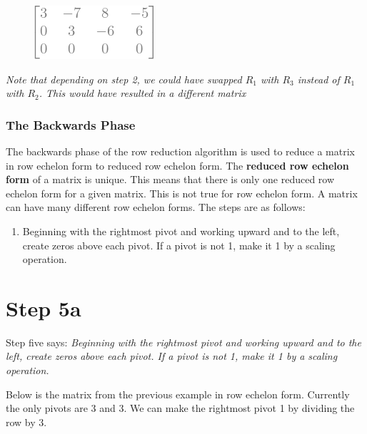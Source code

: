 \documentclass[
  letterpaper,
  DIV=11,
  numbers=noendperiod]{scrreprt}
\providecommand{\tightlist}{%
  \setlength{\itemsep}{0pt}\setlength{\parskip}{0pt}}\usepackage{longtable,booktabs,array}
\begin{document}
\begin{figure}[H]

{\centering \includegraphics{p2_files/figure-pdf/cell-2-output-1.png}

}

\end{figure}

\emph{Note that depending on step 2, we could have swapped \(R_1\) with
\(R_3\) instead of \(R_1\) with \(R_2\). This would have resulted in a
different matrix}

\hypertarget{the-backwards-phase}{%
\subsection*{The Backwards Phase}\label{the-backwards-phase}}

The backwards phase of the row reduction algorithm is used to reduce a
matrix in row echelon form to reduced row echelon form. The
\textbf{reduced row echelon form} of a matrix is unique. This means that
there is only one reduced row echelon form for a given matrix. This is
not true for row echelon form. A matrix can have many different row
echelon forms. The steps are as follows:

\begin{enumerate}
\def\labelenumi{\arabic{enumi}.}
\setcounter{enumi}{4}
\tightlist
\item
  Beginning with the rightmost pivot and working upward and to the left,
  create zeros above each pivot. If a pivot is not 1, make it 1 by a
  scaling operation.
\end{enumerate}

\chapter{Step 5a}

Step five says: \emph{Beginning with the rightmost pivot and working
upward and to the left, create zeros above each pivot. If a pivot is not
1, make it 1 by a scaling operation.}

Below is the matrix from the previous example in row echelon form.
Currently the only pivots are 3 and 3. We can make the rightmost pivot 1
by dividing the row by 3.
\end{document}
